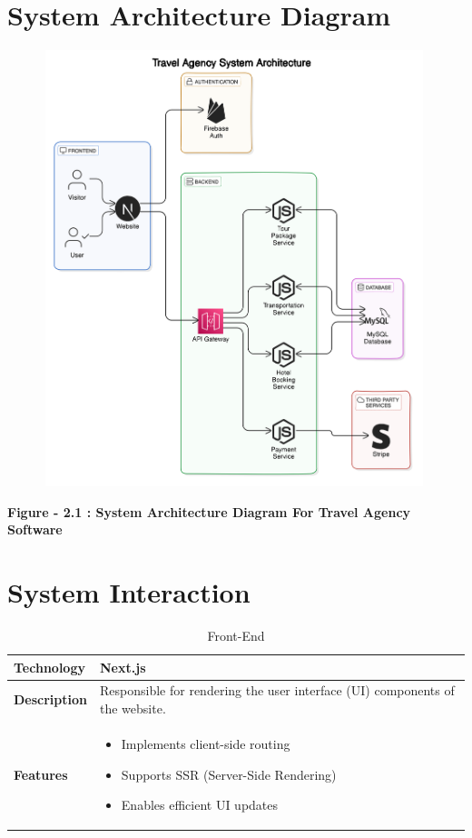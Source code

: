\documentclass{scrreprt}
\begin{document}
\section{System Architecture Diagram}

{\includegraphics[width=500px, height=480px]{TP2.png}}

\begin{center}
    \parbox{0.8\textwidth}{ 
        \centering
        \textbf{Figure - 2.1 : System Architecture Diagram For Travel Agency Software}
    }
\end{center}


\begin{table}[ht]
    
\section{System Interaction}
    \centering
    \caption{Front-End}
    \begin{tabular}{|p{4cm}|p{10cm}|}
    \hline
    \textbf{Technology} & Next.js \\
    \hline
    \textbf{Description} & Responsible for rendering the user interface (UI) components of the website. \\
    \hline
    \textbf{Features} &
    \begin{itemize}[label=$\bullet$]
      \item Implements client-side routing
      \item Supports SSR (Server-Side Rendering)
      \item Enables efficient UI updates
    \end{itemize} \\
    \hline
    \end{tabular}
    \end{table}
    
\end{document}
